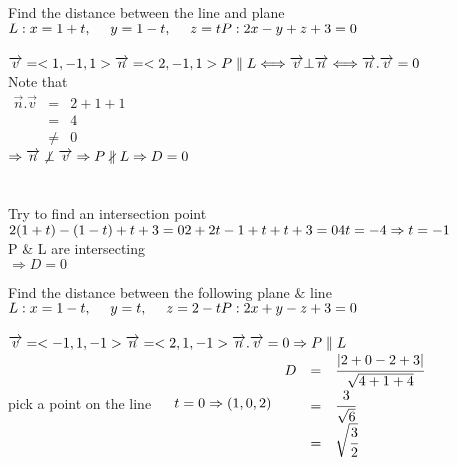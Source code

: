 \begin{example}
Find the distance between the line and plane \\
$L : x=1+t, ~~~~ y=1-t, ~~~~ z=t \\
P : 2x-y+z+3=0$\\
{} \\ 
$\overrightarrow{v}=<1,-1,1> \\ \overrightarrow{n}=<2,-1,1> \\ 
P \parallel L \Longleftrightarrow \overrightarrow{v} \bot \overrightarrow{n} \Longleftrightarrow \overrightarrow{n} . \overrightarrow{v}=0$\\ 
Note that \\
$\begin{array}{rcl}
\overrightarrow{n} . \overrightarrow{v} & = & 2+1+1 \\
 & = & 4  \\
 & \neq & 0
\end{array}$ \\
$\Rightarrow \overrightarrow{n} \not\perp \overrightarrow{v} \\
\Rightarrow P \nparallel L \\
\Rightarrow D=0$ \\ \\
{} \\ 
Try to find an intersection point \\ 
$2(1+t)-(1-t)+t+3=0 \\
2+2t-1+t+t+3=0 \\ 4t=-4 \Rightarrow t=-1$ \\
P \& L are intersecting \\
$\Rightarrow D=0$
\end{example}

\noindent{\color{smalt(darkpowderblue)}\rule{\linewidth}{.2mm}}
\begin{example}
Find the distance between the following plane $\&$ line \\$ L : x=1-t, ~~~~ y=t, ~~~~ z=2-t \\
P : 2x+y-z+3=0 $\\
{} \\
$\overrightarrow{v}=<-1,1,-1> \\
\overrightarrow{n}=<2,1,-1> \\
\overrightarrow{n} . \overrightarrow{v}=0 \Rightarrow P \parallel L$\\ pick a point on the line ~~ $t=0 \Rightarrow (1,0,2) \\ $
$\begin{array}{rcl}
D & = & \cfrac{|2+0-2+3|}{\sqrt{4+1+4}}  \\
 & = & \cfrac{3}{\sqrt{6}} \\
 & = & \sqrt{\cfrac{3}{2}}
\end{array}$
\end{example}
\noindent{\color{smalt(darkpowderblue)}\rule{\linewidth}{.2mm}}

